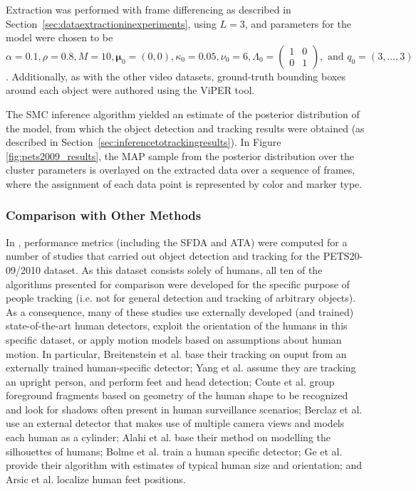 \documentclass[twocolumn, final]{svjour3}
\begin{document}
Extraction was performed with frame differencing as described in Section~\ref{sec:dataextractioninexperiments}, using $L=3$, and parameters for the model were chosen to be $\alpha = 0.1, \rho = 0.8, M = 10, \boldsymbol{\mu}_{0} = (0,0), \kappa_{0} = 0.05, \nu_{0} = 6, \Lambda_{0} = \left( \begin{smallmatrix} 1&0\\ 0&1 \end{smallmatrix} \right), \text{ and } q_{0} = (3, \ldots, 3)$. Additionally, as with the other video datasets, ground-truth bounding boxes around each object were authored using the ViPER tool.

The SMC inference algorithm yielded an estimate of the posterior distribution of the model, from which the object detection and tracking results were obtained (as described in Section~\ref{sec:inferencetotrackingresults}). In Figure \ref{fig:pets2009_results}, the MAP sample from the posterior distribution over the cluster parameters is overlayed on the extracted data over a sequence of frames, where the assignment of each data point is represented by color and marker type.


\subsubsection{Comparison with Other Methods}
\label{sec:comparisonwithothermethods}

In \cite{ellis_2010}, performance metrics (including the SFDA and ATA) were computed for a number of studies that carried out object detection and tracking for the PETS20-\\09/2010 dataset. As this dataset consists solely of humans, all ten of the algorithms presented for comparison were developed for the specific purpose of people tracking (i.e. not for general detection and tracking of arbitrary objects). As a consequence, many of these studies use externally developed (and trained) state-of-the-art human detectors, exploit the orientation of the humans in this specific dataset, or apply motion models based on assumptions about human motion. In particular, Breitenstein et al. \cite{breitenstein2009markovian} base their tracking on ouput from an externally trained human-specific detector; Yang et al. \cite{yang2009probabilistic} assume they are tracking an upright person, and perform feet and head detection; Conte et al. \cite{conte2010performance} group foreground fragments based on geometry of the human shape to be recognized and look for shadows often present in human surveillance scenarios; Berclaz et al. \cite{berclaz2009multiple} use an external detector that makes use of multiple camera views and models each human as a cylinder; Alahi et al. \cite{alahi2009sparsity} base their method on modelling the silhouettes of humans; Bolme et al. \cite{bolme2009simple} train a human specific detector; Ge et al. \cite{ge2009evaluation} provide their algorithm with estimates of typical human size and orientation; and Arsic et al. \cite{arsic2009multi} localize human feet positions.
\end{document}
